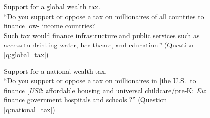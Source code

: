 
\begin{figure}[h!]
    \caption[Support for a global wealth tax]{Support for a global wealth tax. \\
    ``Do you support or oppose a tax on millionaires of all countries to finance low-
    income countries? \\
    Such tax would finance infrastructure and public services such as access to drinking water, healthcare, and education.'' (Question \ref{q:global_tax})}\label{fig:global_tax}
\end{figure}

\begin{figure}[h!]
    \caption[Support for a national wealth tax]{Support for a national wealth tax. \\ ``Do you support or oppose a tax on millionaires in [the U.S.] to finance [\textit{US2}: affordable housing and universal childcare/pre-K; \textit{Eu}: finance government hospitals and schools]?'' %
    (Question \ref{q:national_tax})}\label{fig:national_tax}
\end{figure}

